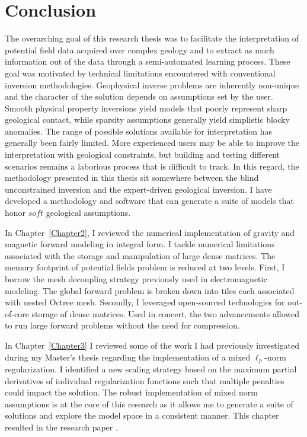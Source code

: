 \graphicspath{{./../../Figures/}}
\chapter{Conclusion}
\label{Chapter8}

The overarching goal of this research thesis was to facilitate the interpretation of potential field data acquired over complex geology and to extract as much information out of the data through a semi-automated learning process.
These goal was motivated by technical limitations encountered with conventional inversion methodologies.
Geophysical inverse problems are inherently non-unique and the character of the solution depends on assumptions set by the user.
Smooth physical property inversions yield models that poorly represent sharp geological contact, while sparsity assumptions generally yield simplistic blocky anomalies. The range of possible solutions available for interpretation has generally been fairly limited.
More experienced users may be able to improve the interpretation with geological constraints, but building and testing different scenarios remains a laborious process that is difficult to track.
In this regard, the methodology presented in this thesis sit somewhere  between the blind unconstrained inversion and the expert-driven geological inversion. I have developed a methodology and software that can generate a suite of models that honor $soft$ geological assumptions.

In Chapter~\ref{Chapter2}, I reviewed the numerical implementation of gravity and magnetic forward modeling in integral form. I tackle numerical limitations associated with the storage and manipulation of large dense matrices. The memory footprint of potential fields problem is reduced at two levels. First, I borrow the mesh decoupling strategy previously used in electromagnetic modeling. The global forward problem is broken down into tiles each associated with nested Octree mesh. Secondly, I leveraged open-sourced technologies for out-of-core storage of dense matrices. Used in concert, the two advancements allowed to run large forward problems without the need for compression.

In Chapter~\ref{Chapter3} I reviewed some of the work I had previously investigated during my Master's thesis regarding the implementation of a mixed $\ell_p$-norm regularization. I identified a new scaling strategy based on the maximum partial derivatives of individual regularization functions such that multiple penalties could impact the solution. The robust implementation of mixed norm assumptions is at the core of this research as it allows me to generate a suite of solutions and explore the model space in a consistent manner.
This chapter resulted in the research paper \cite{Fournier2019b}.

